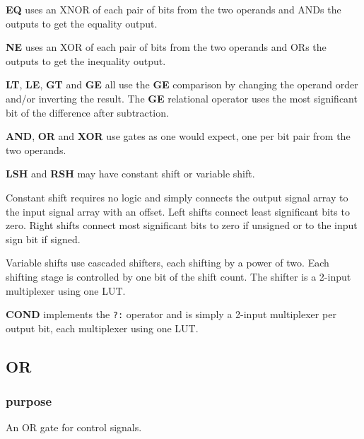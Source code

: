 \documentclass[10pt,a4paper,twoside,fleqn]{book}
\begin{document}
                    {\bf EQ} uses an XNOR of each pair of bits from the
                    two operands and ANDs the outputs to get the equality
                    output.

                    {\bf NE}  uses an XOR of each pair of bits from the
                    two operands and ORs the outputs to get the inequality
                    output.   

                    {\bf LT}, {\bf LE}, {\bf GT} and {\bf GE} all use
                    the {\bf GE} comparison by changing the operand order
                    and/or inverting the result. The {\bf GE} relational
                    operator uses the most significant bit of the difference
                    after subtraction.

                    {\bf AND}, {\bf OR} and {\bf XOR} use gates as one 
                    would expect, one per bit pair from the two operands.

                    {\bf LSH} and {\bf RSH} may have constant shift or variable
                    shift.
                    
                    Constant shift requires no logic and simply connects the
                    output signal array to the input signal array with an
                    offset. Left shifts connect least significant bits to zero.
                    Right shifts connect most significant bits to zero if
                    unsigned or to the input sign bit if signed.

                    Variable shifts use cascaded shifters, each shifting by a
                    power of two. Each shifting stage is controlled by one bit
                    of the shift count. The shifter is a 2-input multiplexer
                    using one LUT.

                    {\bf COND} implements the \verb'?:' operator and is simply a
                    2-input multiplexer per output bit, each multiplexer using
                    one LUT.


            \subsection{OR}

                \subsubsection{purpose}

                    An OR gate for control signals.
\end{document}
